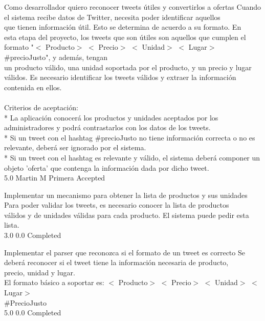 	{Como desarrollador quiero reconocer tweets útiles y convertirlos a ofertas} %
	{Cuando el sistema recibe datos de Twitter, necesita poder identificar aquellos\\
que tienen información útil. Esto se determina de acuerdo a su formato. En\\
esta etapa del proyecto, los tweets que son útiles son aquellos que cumplen el\\
formato "$<$ Producto$>$  $<$ Precio$>$  $<$ Unidad$>$  $<$ Lugar$>$  #precioJusto", y además, tengan\\
un producto válido, una unidad soportada por el producto, y un precio y lugar\\
válidos. Es necesario identificar los tweets válidos y extraer la información\\
contenida en ellos.\\
  \\
Criterios de aceptación:\\
* La aplicación conocerá los productos y unidades aceptados por los administradores y podrá contrastarlos con los datos de los tweets.  \\
* Si un tweet con el hashtag #precioJusto no tiene información correcta o no es relevante, deberá ser ignorado por el sistema.  \\
* Si un tweet con el hashtag es relevante y válido, el sistema deberá componer un objeto 'oferta' que contenga la información dada por dicho tweet.\\
} %
	{} %
	{5.0} %
	{Martin M} %
	{Primera} %
	{Accepted} %

		{Implementar un mecanismo para obtener la lista de productos y sus unidades} %
		{Para poder validar los tweets, es necesario conocer la lista de productos\\
válidos y de unidades válidas para cada producto. El sistema puede pedir esta\\
lista.\\
} %
		{3.0} %
		{} %
		{0.0} %
		{Completed} %

		{Implementar el parser que reconozca si el formato de un tweet es correcto} %
		{Se deberá reconocer si el tweet tiene la información necesaria de producto,\\
precio, unidad y lugar.\\
El formato básico a soportar es: $<$ Producto$>$  $<$ Precio$>$  $<$ Unidad$>$  $<$ Lugar$>$ \\
#PrecioJusto\\
} %
		{5.0} %
		{} %
		{0.0} %
		{Completed} %

